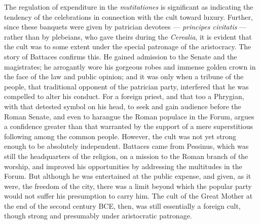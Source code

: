 \documentclass[a4paper, 11pt, oneside, polutonikogreek, english]{article}
\begin{document}
The regulation of expenditure in the \emph{mutitationes} is significant as indicating the tendency of the celebrations in connection with the cult toward luxury. Further, since these banquets were given by patrician devotees --- \emph{principes civitatis} --- rather than by plebeians, who gave theirs during the \emph{Cerealia}, it is evident that the cult was to some extent under the special patronage of the aristocracy. The story of Battaces confirms this. He gained admission to the Senate and the magistrates; he arrogantly wore his gorgeous robes and immense golden crown in the face of the law and public opinion; and it was only when a tribune of the people, that traditional opponent of the patrician party, interfered that he was compelled to alter his conduct. For a foreign priest, and that too a Phrygian, with that detested symbol on his head, to seek and gain audience before the Roman Senate, and even to harangue the Roman populace in the Forum, argues a confidence greater than that warranted by the support of a mere superstitious following among the common people. However, the cult was not yet strong enough to be absolutely independent. Battaces came from Pessinus, which was still the headquarters of the religion, on a mission to the Roman branch of the worship, and improved his opportunities by addressing the multitudes in the Forum. But although he was entertained at the public expense, and given, as it were, the freedom of the city, there was a limit beyond which the popular party would not suffer his presumption to carry him. The cult of the Great Mother at the end of the second century \textsc{BCE}, then, was still essentially a foreign cult, though strong and presumably under aristocratic patronage.
\end{document}
